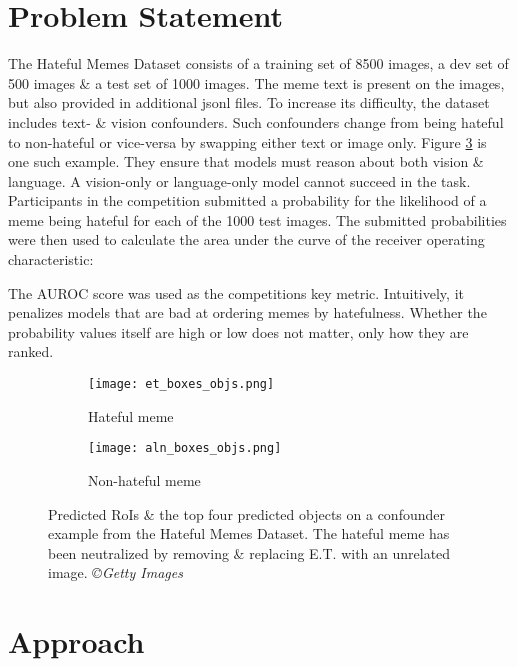 \documentclass{article}
\begin{document}
\section{Problem Statement}
\label{sec:headings}

The Hateful Memes Dataset \cite{kiela2020hateful} consists of a training set of 8500 images, a dev set of 500 images \& a test set of 1000 images. The meme text is present on the images, but also provided in additional jsonl files. 
To increase its difficulty, the dataset includes text- \& vision confounders. Such confounders change from being hateful to non-hateful or vice-versa by swapping either text or image only. Figure \ref{fig:fig1} is one such example. They ensure that models must reason about both vision \& language. A vision-only or language-only model cannot succeed in the task.\\
Participants in the competition submitted a probability for the likelihood of a meme being hateful for each of the 1000 test images. The submitted probabilities were then used to calculate the area under the curve of the receiver operating characteristic:

The AUROC score was used as the competitions key metric. Intuitively, it penalizes models that are bad at ordering memes by hatefulness. Whether the probability values itself are high or low does not matter, only how they are ranked.

\begin{figure}[t]
\begin{subfigure}{0.5\textwidth}
\centering
\texttt{[image: et\_boxes\_objs.png]} \caption{Hateful meme}
\label{fig:subim1}
\end{subfigure}
\begin{subfigure}{0.5\textwidth}
\centering
\texttt{[image: aln\_boxes\_objs.png]} \caption{Non-hateful meme}
\label{fig:subim2}
\end{subfigure}
\captionsetup{justification=centering}
\caption{Predicted RoIs \& the top four predicted objects on a confounder example from the Hateful Memes Dataset. The hateful meme has been neutralized by removing \& replacing E.T. with an unrelated image. \textit{©Getty Images}}
\label{fig:fig1}
\end{figure}


\section{Approach}
\label{sec:others}
\end{document}
